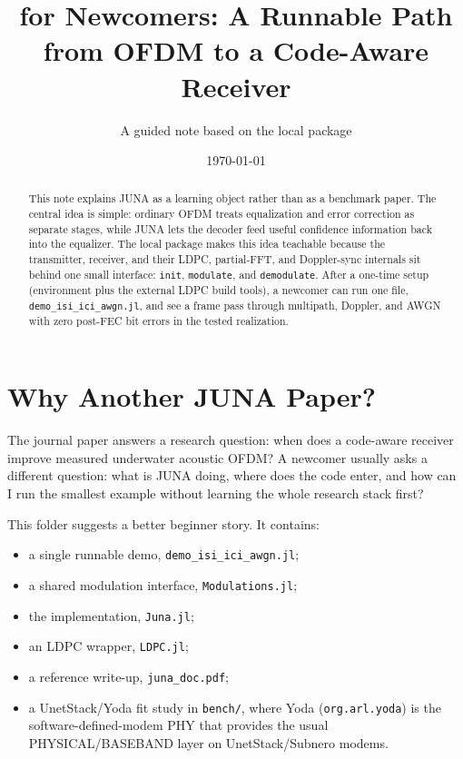 \documentclass[11pt]{article}
\title{\juna{} for Newcomers: A Runnable Path from OFDM to a Code-Aware Receiver}
\author{A guided note based on the local \code{Juna/} package}
\date{\today}
\newcommand{\code}[1]{\texttt{#1}}
\newcommand{\juna}{JUNA}
\begin{document}
\maketitle

\begin{abstract}
This note explains \juna{} as a learning object rather than as a benchmark
paper. The central idea is simple: ordinary OFDM treats equalization and error
correction as separate stages, while \juna{} lets the decoder feed useful
confidence information back into the equalizer. The local package makes this
idea teachable because the transmitter, receiver, and their LDPC, partial-FFT,
and Doppler-sync internals sit behind one small interface: \code{init},
\code{modulate}, and \code{demodulate}. After a one-time setup
(environment plus the external LDPC build tools), a newcomer can run one file,
\code{demo\_isi\_ici\_awgn.jl}, and see a frame pass through multipath, Doppler,
and AWGN with zero post-FEC bit errors in the tested realization.
\end{abstract}

\section{Why Another \juna{} Paper?}

The journal paper answers a research question: when does a code-aware receiver
improve measured underwater acoustic OFDM? A newcomer usually asks a different
question: what is \juna{} doing, where does the code enter, and how can I run the
smallest example without learning the whole research stack first?

This folder suggests a better beginner story. It contains:
\begin{itemize}
  \item a single runnable demo, \code{demo\_isi\_ici\_awgn.jl};
  \item a shared modulation interface, \code{Modulations.jl};
  \item the implementation, \code{Juna.jl};
  \item an LDPC wrapper, \code{LDPC.jl};
  \item a reference write-up, \code{juna\_doc.pdf};
  \item a UnetStack/Yoda fit study in \code{bench/}, where Yoda
        (\code{org.arl.yoda}) is the software-defined-modem PHY that provides
        the usual PHYSICAL/BASEBAND layer on UnetStack/Subnero modems.
\end{itemize}
\end{document}
